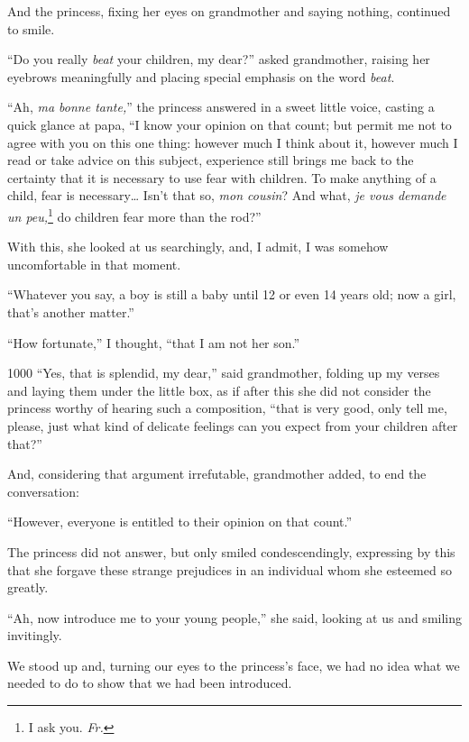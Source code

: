 And the princess, fixing her eyes on grandmother and saying nothing, continued to smile.

``Do you really \textit{beat} your children, my dear?'' asked grandmother, raising her eyebrows meaningfully and placing special emphasis on the word \textit{beat}. %

``Ah, \textit{ma bonne tante,}'' the princess answered in a sweet little voice, casting a quick glance at papa, ``I know your opinion on that count; but permit me not to agree with you on this one thing: however much I think about it, however much I read or take advice on this subject, experience still brings me back to the certainty that it is necessary to use fear with children. To make anything of a child, fear is necessary\ldots{} Isn't that so, \textit{mon cousin}? And what, \textit{je vous demande un peu,}\footnote{I ask you. \textit{Fr.}} do children fear more than the rod?'' %

With this, she looked at us searchingly, and, I admit, I was somehow uncomfortable in that moment.

``Whatever you say, a boy is still a baby until 12 or even 14 years old; now a girl, that's another matter.'' %

``How fortunate,'' I thought, ``that I am not her son.'' %

\begin{tolerant}{1000}
``Yes, that is splendid, my dear,'' said grandmother, folding up my verses and laying them under the little box, as if after this she did not consider the princess worthy of hearing such a composition, ``that is very good, only tell me, please, just what kind of delicate feelings can you expect from your children after that?'' %
\end{tolerant}

And, considering that argument irrefutable, grandmother added, to end the conversation:

``However, everyone is entitled to their opinion on that count.'' %

The princess did not answer, but only smiled condescendingly, expressing by this that she forgave these strange prejudices in an individual whom she esteemed so greatly.

``Ah, now introduce me to your young people,'' she said, looking at us and smiling invitingly. %

We stood up and, turning our eyes to the princess's face, we had no idea what we needed to do to show that we had been introduced.


